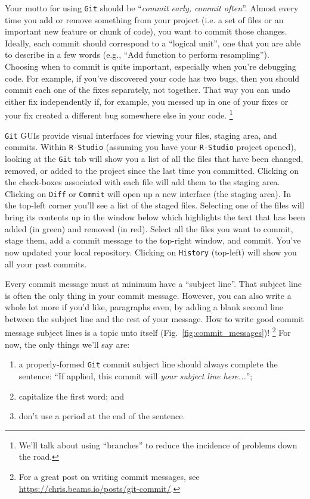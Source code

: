 \documentclass[12pt,letterpaper]{article}
\begin{document}
\noindent
Your motto for using \texttt{Git} should be ``\emph{commit early, commit often}''.
Almost every time you add or remove something from your project
(i.e. a set of files or an important new feature or chunk of code), 
you want to commit those changes.
Ideally, each commit should correspond to a ``logical unit'', 
one that you are able to describe in a few words
(e.g., ``Add function to perform resampling'').
Choosing when to commit is quite important, 
especially when you're debugging code.
For example, if you've discovered your code has two bugs, 
then you should commit each one of the fixes separately, not together.
That way you can undo either fix independently if, for example, 
you messed up in one of your fixes or your fix created a different bug somewhere else in your code.
\unskip
\footnote{
	We'll talk about using ``branches'' to reduce the incidence of problems down the road.}

\texttt{Git} GUIs provide visual interfaces for viewing your files, 
staging area, and commits.
Within \texttt{R-Studio}
(assuming you have your \texttt{R-Studio} project opened), 
looking at the \texttt{Git} tab will show you a list of all the files that have been changed, removed, or added to the project since the last time you committed.
Clicking on the check-boxes associated with each file will add them to the staging area.
Clicking on \texttt{Diff} or \texttt{Commit} will open up a new interface (the staging area).
In the top-left corner you'll see a list of the staged files.
Selecting one of the files will bring its contents up in the window below which highlights the text that has been added (in green) and removed (in red).
Select all the files you want to commit, stage them, 
add a commit message to the top-right window, and commit.
You've now updated your local repository.
Clicking on \texttt{History} (top-left) will show you all your past commits.
  
Every commit message must at minimum have a ``subject line''.
That subject line is often the only thing in your commit message.  
However, you can also write a whole lot more if you'd like, paragraphs even, 
by adding a blank second line between the subject line and the rest of your 
message.  
How to write good commit message subject lines is a topic unto itself
(Fig.~\ref{fig:commit_messages})! 
\unskip
\footnote{
	For a great post on writing commit messages, see 
	\url{https://chris.beams.io/posts/git-commit/}.} 
For now, the only things we'll say are:
\begin{enumerate}
	\item a properly-formed \texttt{Git} commit subject line should always 
	complete the sentence:  
``If applied, this commit will \emph{your subject line here...}'';
	\item capitalize the first word; and
	\item don't use a period at the end of the sentence.	
\end{enumerate} 
\end{document}
